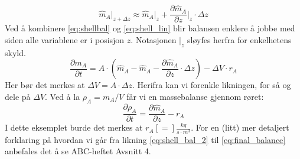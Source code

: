 \begin{equation}
    \label{eq:shell_lin}
    \hat{m}_A\big|_{z+\Delta z} \approx \hat{m}_A\big|_z + \frac{\partial \hat{m}_A}{\partial z}\Big|_z \cdot \Delta z
\end{equation}
Ved å kombinere \cref{eq:shellbal} og \cref{eq:shell_lin} blir balansen enklere å jobbe med siden alle variablene er i posisjon $z$. Notasjonen $\big|_z$ sløyfes herfra for enkelhetens skyld. 
\begin{equation}
    \label{eq:shell_bal_2}
    \frac{\partial m_A}{\partial t} = A \cdot \left(\hat{m}_A - \hat{m}_A - \frac{\partial \hat{m}_A}{\partial z} \cdot \Delta z \right) - \Delta V \cdot r_A
\end{equation}
Her bør det merkes at $\Delta V = A \cdot \Delta z$. Herifra kan vi forenkle likningen, for så og dele på $\Delta V$. Ved å la $\rho_A = m_A/V$ får vi en massebalanse gjennom røret:
\begin{equation}
    \label{eq:final_balance}
    \frac{\partial \rho_A}{\partial t} = \frac{\partial \hat{m}_A}{\partial z} - r_A
\end{equation}
I dette eksemplet burde det merkes at $r_A [=] \frac{kg}{s \cdot m^3}$. For en (litt) mer detaljert forklaring på hvordan vi går fra likning \cref{eq:shell_bal_2} til \cref{eq:final_balance} anbefales det å se ABC-heftet Avsnitt 4.